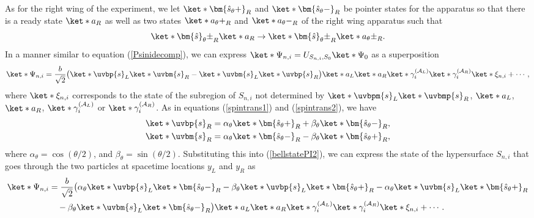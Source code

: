 \documentclass[12pt]{report}
\begin{document}
As for the right wing of the experiment, we let  $\ket*{\bm{\hat{s}_\theta+}}_R$ and $\ket*{\bm{\hat{s}_\theta-}}_R$ %
%
 be pointer states for the apparatus so that there is a ready state $\ket*{a}_R$  %
   as well as two states $\ket*{a_\theta+}_R$ and $\ket*{a_\theta-}_R$ %
   of the right wing apparatus such that 
$$\ket*{\bm{\hat{s}}_\theta\pm}_R\ket*{a}_R\rightarrow\ket*{\bm{\hat{s}}_\theta\pm}_R\ket*{a_\theta\pm}_R.$$
In a manner similar to equation (\ref{Psinidecomp}), we can express $\ket*{\Psi_{n,i}}=U_{S_{n,i},S_0}\ket*{\Psi_0}$ as a superposition
\begin{equation}\label{bellstatePI2}
	\ket*{\Psi_{n,i}}= \frac{b}{\sqrt{2}}\big(\ket*{\uvbp{s}}_L\ket*{\uvbm{s}}_R-\ket*{\uvbm{s}}_L\ket*{\uvbp{s}}_R\big)\ket*{a}_L\ket*{a}_R\ket*{\gamma_i^{(\mathcal{A}_L)}}\ket*{\gamma_i^{(\mathcal{A}_R)}}\ket*{\xi_{n,i}}+\cdots,
\end{equation}
where $\ket*{\xi_{n,i}}$ corresponds to the state of the subregion of $S_{n,i}$ not determined by $\ket*{\uvbpm{s}}_L\ket*{\uvbmp{s}}_R$, $\ket*{a}_L$, $\ket*{a}_R$, $\ket*{\gamma_i^{(\mathcal{A}_L)}}$ or $\ket*{\gamma_i^{(\mathcal{A}_R)}}$.
As in equations (\ref{spintrans1}) and (\ref{spintrans2}), we have
\begin{align*}
\ket*{\uvbp{s}}_R&= \alpha_\theta\ket*{\bm{\hat{s}_\theta+}}_R+\beta_\theta \ket*{\bm{\hat{s}_\theta-}}_R,\\
\ket*{\uvbm{s}}_R&= \alpha_\theta\ket*{\bm{\hat{s}_\theta-}}_R-\beta_\theta \ket*{\bm{\hat{s}_\theta+}}_R,
\end{align*}
where $\alpha_\theta=\cos(\theta/2)$, and $\beta_\theta=\sin(\theta/2).$
Substituting this into (\ref{bellstatePI2}), we can express the state of the hypersurface $S_{n,i}$ that goes through the two particles at spacetime locations $y_L$ and $y_R$ as
\begin{equation}\label{bellstatePI3}
	\begin{split}
	\ket*{\Psi_{n,i}}&=\frac{b}{\sqrt{2}}\big(\alpha_\theta\ket*{\uvbp{s}}_L\ket*{\bm{\hat{s}_\theta-}}_R
	-\beta_\theta\ket*{\uvbp{s}}_L\ket*{\bm{\hat{s}_\theta+}}_R-\alpha_\theta\ket*{\uvbm{s}}_L\ket*{\bm{\hat{s}_\theta+}}_R\\
	&\quad
	-\beta_\theta\ket*{\uvbm{s}}_L\ket*{\bm{\hat{s}_\theta-}}_R\big)\ket*{a}_L\ket*{a}_R\ket*{\gamma_i^{(\mathcal{A}_L)}}\ket*{\gamma_i^{(\mathcal{A}_R)}}\ket*{\xi_{n,i}}+\cdots.
	\end{split}
\end{equation}
\end{document}
